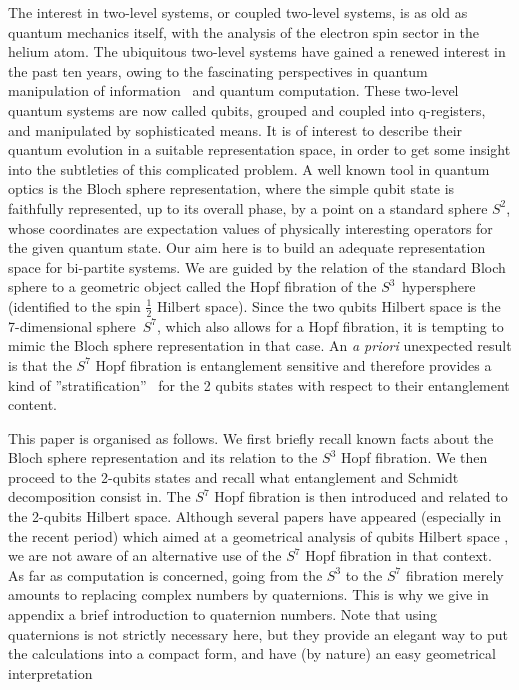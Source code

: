 \documentclass{amsart}
\begin{document}
The interest in two-level systems, or coupled two-level systems, is as old as
quantum mechanics itself, with the analysis of the electron spin sector in the
helium atom. The ubiquitous two-level systems have gained a renewed interest
in the past ten years, owing to the fascinating perspectives in quantum
manipulation of information \ and quantum computation\cite{q_info_gen}. These
two-level quantum systems are now called qubits, grouped and coupled into
q-registers, and manipulated by sophisticated means. It is of interest to
describe their quantum evolution in a suitable representation space, in order
to get some insight into the subtleties of this complicated problem. A well
known tool in quantum optics is the Bloch sphere representation, where the
simple qubit state is faithfully represented, up to its overall phase, by a
point on a standard sphere $S^{2}$, whose coordinates are expectation values
of physically interesting operators for the given quantum state. Our aim here
is to build an adequate representation space for bi-partite systems. We are
guided by the relation of the standard Bloch sphere to a geometric object
called the Hopf fibration of the $S^{3\text{ }}$hypersphere (identified to the
spin
${\frac12}$%
Hilbert space). Since the two qubits Hilbert space is the 7-dimensional
sphere\ $S^{7}$, which also allows for a Hopf fibration, it is tempting to
mimic the Bloch sphere representation in that case. An \textit{a priori}
unexpected result is that the $S^{7}$ Hopf fibration is entanglement sensitive
and therefore provides a kind of ''stratification'' \ for the 2 qubits states
with respect to their entanglement content.

This paper is organised as follows. We first briefly recall known facts about
the Bloch sphere representation and its relation to the $S^{3}$ Hopf
fibration. We then proceed to the 2-qubits states and recall what entanglement
and Schmidt decomposition consist in. The $S^{7}$ Hopf fibration is then
introduced and related to the 2-qubits Hilbert space. Although several papers
have appeared (especially in the recent period) which aimed at a geometrical
analysis of qubits Hilbert space \cite{2qbits_geometry}, we are not aware of
an alternative use of the $S^{7}$ Hopf fibration in that context. As far as
computation is concerned, going from the $S^{3}$ to the $S^{7}$ fibration
merely amounts to replacing complex numbers by quaternions. This is why we
give in appendix a brief introduction to quaternion numbers. Note that using
quaternions is not strictly necessary here, but they provide an elegant way to
put the calculations into a compact form, and have (by nature) an easy
geometrical interpretation
\end{document}
